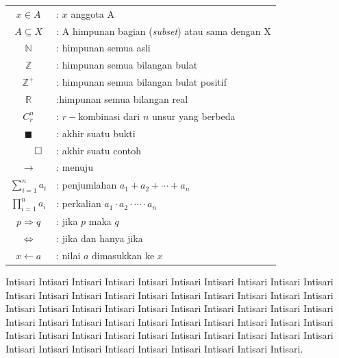 \documentclass{uinsaintekskripsi}
\begin{document}
\lambang
\begin{tabular}{cp{10.5cm}}
  $x\in A$ & : $x$ anggota A\\
  $A\subseteq X$ & : A himpunan bagian (\textit{subset}) atau sama dengan X\\
  $\mathbb{N}$ & : himpunan semua asli\\
  $\mathbb{Z}$ & : himpunan semua bilangan bulat\\
  $\mathbb{Z}^{+}$ & : himpunan semua bilangan bulat positif\\
  $\mathbb{R}$ & :himpunan semua bilangan real\\
  $C^{n}_{r}$ & : $r-$kombinasi dari $n$ unsur yang berbeda\\
  $\blacksquare$ & : akhir suatu bukti\\
  $\qed$\hfill & : akhir suatu contoh\\
  $\rightarrow$ & : menuju\\
  $\displaystyle\sum_{i=1}^{n}{a_{i}}$ & : penjumlahan $a_{1}+a_{2}+\cdots + a_{n}$\\
  $\displaystyle\prod_{i=1}^{n}{a_{i}}$ & : perkalian $a_{1}\cdot a_{2}\cdot\cdots \cdot a_{n}$\\
  $p \Rightarrow q$ & : jika $p$ maka $q$\\
  $\Leftrightarrow$ & : jika dan hanya jika\\
  $x\leftarrow a$ & : nilai $a$ dimasukkan ke $x$
\end{tabular}


\begin{abstractind}
Intisari Intisari Intisari Intisari Intisari Intisari Intisari Intisari Intisari Intisari Intisari Intisari Intisari Intisari Intisari Intisari Intisari Intisari Intisari Intisari Intisari Intisari Intisari Intisari Intisari Intisari Intisari Intisari Intisari Intisari Intisari Intisari Intisari Intisari Intisari Intisari Intisari Intisari Intisari Intisari Intisari Intisari Intisari Intisari Intisari Intisari Intisari Intisari Intisari Intisari Intisari Intisari Intisari Intisari Intisari Intisari Intisari Intisari Intisari.
\end{abstractind}
\end{document}
